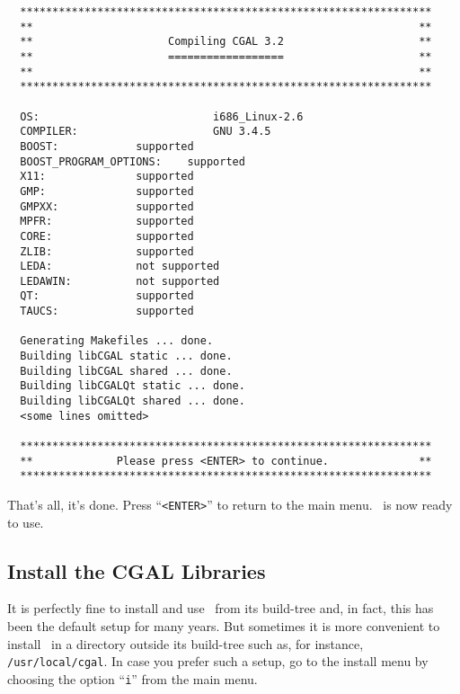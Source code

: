 {\ccTexHtml{\scriptsize}{}
\begin{verbatim}
  ****************************************************************
  **                                                            **
  **                     Compiling CGAL 3.2                     **
  **                     ==================                     **
  **                                                            **
  ****************************************************************

  OS:                           i686_Linux-2.6
  COMPILER:                     GNU 3.4.5
  BOOST:			supported
  BOOST_PROGRAM_OPTIONS:	supported
  X11:				supported
  GMP:				supported
  GMPXX:			supported
  MPFR:				supported
  CORE:				supported
  ZLIB:				supported
  LEDA:				not supported
  LEDAWIN:			not supported
  QT:				supported
  TAUCS:			supported

  Generating Makefiles ... done.
  Building libCGAL static ... done.
  Building libCGAL shared ... done.
  Building libCGALQt static ... done.
  Building libCGALQt shared ... done.
  <some lines omitted>

  ****************************************************************
  **             Please press <ENTER> to continue.              **
  ****************************************************************
\end{verbatim}}
{
}

That's all, it's done. Press ``\texttt{<ENTER>}'' to return to the
main menu. \cgal\ is now ready to use.

\subsection{Install the CGAL Libraries\label{sec:install-the-libs}}

It is perfectly fine to install and use \cgal\ from its build-tree
and, in fact, this has been the default setup for many years. But
sometimes it is more convenient to install \cgal\ in a directory
outside its build-tree such as, for instance,
\texttt{/usr/local/cgal}. In case you prefer such a setup, go to the
install menu by choosing the option ``\texttt{i}'' from the main menu.

